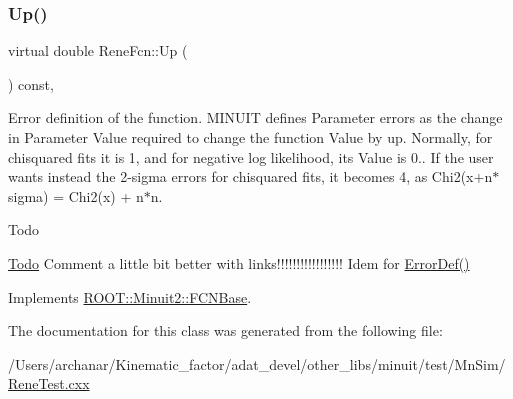 \mbox{\label{classReneFcn_a5e7e439a47c37d673d9366918c74239c}} 
\subsubsection{\texorpdfstring{Up()}{Up()}}
{\footnotesize\ttfamily virtual double Rene\+Fcn\+::\+Up (\begin{DoxyParamCaption}{ }\end{DoxyParamCaption}) const\hspace{0.3cm}{\ttfamily [inline]}, {\ttfamily [virtual]}}

Error definition of the function. M\+I\+N\+U\+IT defines Parameter errors as the change in Parameter Value required to change the function Value by up. Normally, for chisquared fits it is 1, and for negative log likelihood, its Value is 0.. If the user wants instead the 2-\/sigma errors for chisquared fits, it becomes 4, as Chi2(x+n$\ast$sigma) = Chi2(x) + n$\ast$n.

\begin{DoxyRefDesc}{Todo}
\item[\mbox{\hyperlink{todo__todo000001}{Todo}}]Comment a little bit better with links!!!!!!!!!!!!!!!!! Idem for \mbox{\hyperlink{classROOT_1_1Minuit2_1_1FCNBase_ac4592475c58a65b037ba97ab5f3cba10}{Error\+Def()}}\end{DoxyRefDesc}


Implements \mbox{\hyperlink{classROOT_1_1Minuit2_1_1FCNBase_a04ef08ddad92ce8d89d498efbe021c39}{R\+O\+O\+T\+::\+Minuit2\+::\+F\+C\+N\+Base}}.



The documentation for this class was generated from the following file\+:\begin{DoxyCompactItemize}
\item 
/\+Users/archanar/\+Kinematic\+\_\+factor/adat\+\_\+devel/other\+\_\+libs/minuit/test/\+Mn\+Sim/\mbox{\hyperlink{ReneTest_8cxx}{Rene\+Test.\+cxx}}\end{DoxyCompactItemize}
